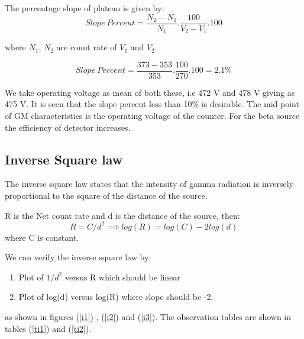 \documentclass[a4paper, amsfonts, amssymb, amsmath, reprint, showkeys, nofootinbib, twoside]{revtex4-1}
\begin{document}
The percentage slope of plateau is given by:
\begin{equation}
	Slope~Percent=\frac{N_2-N_1}{N_1}.\frac{100}{V_2-V_1}.100
\end{equation}

where $N_1$, $N_2$ are count rate of  $V_1$ and $V_2$.

\begin{equation}
	Slope~Percent=\frac{373-353}{353}.\frac{100}{270}.100=2.1\%
\end{equation}

We take operating voltage as mean of both these, i.e 472 V and 478 V giving as 475 V. It is seen that the slope percent less than 10\% is desirable. The mid point of GM characteristics is the operating voltage of the counter. For the beta source the efficiency of detector increases.

\subsection{Inverse Square law} 

The inverse square law states that the intensity of gamma radiation is inversely proportional to the square of the distance of the source.

R is the Net count rate and d is the distance of the source, then:
\begin{equation}
	R=C/d^{2}\implies log(R)=log(C)-2log(d)
\end{equation}
where C is constant.

We can verify the inverse square law by:
\begin{enumerate}
	\item Plot of $1/d^2$ versus R which should be linear
	\item Plot of log(d) versus log(R) where slope should be -2.
\end{enumerate}
as shown in figures (\ref{i1}) , (\ref{i2}) and  (\ref{i3}). The observation tables are shown in tables (\ref{ti1}) and (\ref{ti2}).

\begin{table}[H]
	\centering
	\caption{The mean count is 77.8 with net count rate as 1.3 cps}
	\label{ti1}
\end{table}
\end{document}
